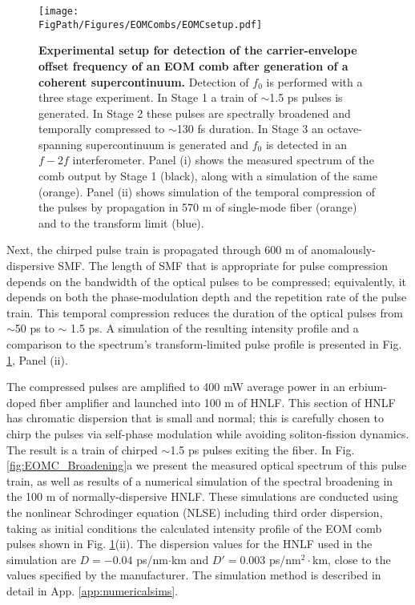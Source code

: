 \begin{figure}[htpb]
	\begin{center}
		\texttt{[image: \\FigPath/Figures/EOMCombs/EOMCsetup.pdf]}
	\end{center}
	\caption[Experimental setup for detection of the carrier-envelope offset frequency of an EOM comb after generation of a coherent supercontinuum]{\textbf{Experimental setup for detection of the carrier-envelope offset frequency of an EOM comb after generation of a coherent supercontinuum.} Detection of $f_0$ is performed with a three stage experiment. In Stage 1 a train of $\sim$1.5 ps pulses is generated. In Stage 2 these pulses are spectrally broadened and temporally compressed to $\sim$130 fs duration. In Stage 3 an octave-spanning supercontinuum is generated and $f_0$ is detected in an $f-2f$ interferometer. Panel (i) shows the measured spectrum of the comb output by Stage 1 (black), along with a simulation of the same (orange). Panel (ii) shows simulation of the temporal compression of the pulses by propagation in 570 m of single-mode fiber (orange) and to the transform limit (blue).}
	\label{fig:EOMC_Schematic}
\end{figure} 


Next, the chirped pulse train is propagated through 600 m of anomalously-dispersive SMF. The length of SMF that is appropriate for pulse compression depends on the bandwidth of the optical pulses to be compressed; equivalently, it depends on both the phase-modulation depth and the repetition rate of the pulse train. This temporal compression reduces the duration of the optical pulses from $\sim$50 ps to $\sim$ 1.5 ps. A simulation of the resulting intensity profile and a comparison to the spectrum's transform-limited pulse profile is presented in Fig. \ref{fig:EOMC_Schematic}, Panel (ii). 

The compressed pulses are amplified to 400 mW average power in an erbium-doped fiber amplifier and launched into 100 m of HNLF. This section of HNLF has chromatic dispersion that is small and normal; this is carefully chosen to chirp the pulses via self-phase modulation while avoiding soliton-fission dynamics\cite{Dudley2006}. The result is a train of chirped $\sim$1.5 ps pulses exiting the fiber.  In Fig. \ref{fig:EOMC_Broadening}a we present the measured optical spectrum of this pulse train, as well as results of a numerical simulation of the spectral broadening in the 100 m of normally-dispersive HNLF. These simulations are conducted using the nonlinear Schrodinger equation (NLSE) including third order dispersion\cite{Agrawal2007}, taking as initial conditions the calculated intensity profile of the EOM comb pulses shown in Fig. \ref{fig:EOMC_Schematic}(ii). The dispersion values for the HNLF used in the simulation are $D=-0.04$  ps/nm$\cdot$km and $D'=0.003$ ps/nm$^2\cdot$km, close to the values specified by the manufacturer. The simulation method is described in detail in App. \ref{app:numericalsims}.

